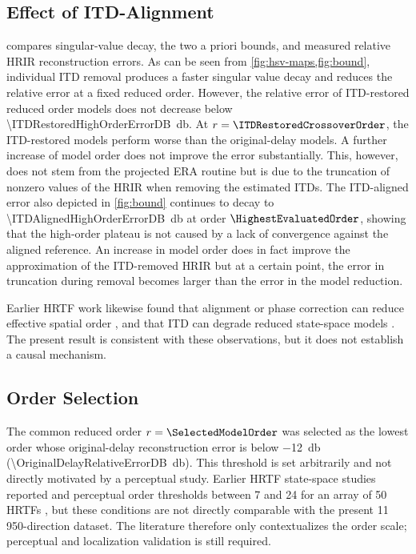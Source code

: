 \documentclass[non-peer-review]{fa2026}
\begin{document}
\subsection{Effect of \acs{ITD}-Alignment}
\label{sec:itd-results}
%
 compares singular-value decay, the two a priori bounds, and measured relative \ac{HRIR} reconstruction
errors. As can be seen from \cref{fig:hsv-maps,fig:bound}, individual \ac{ITD} removal produces a faster singular value
decay and reduces the relative error at a fixed reduced order. However, the relative error of \ac{ITD}-restored reduced
order models does not decrease below \SI{\ITDRestoredHighOrderErrorDB}{\decibel}. At \(r=\ITDRestoredCrossoverOrder\),
the \ac{ITD}-restored models perform worse than the original-delay models. A further increase of model order does not
improve the error substantially. This, however, does not stem from the projected \ac{ERA} routine but is due to the
truncation of nonzero values of the \ac{HRIR} when removing the estimated \acp{ITD}. The \ac{ITD}-aligned error also
depicted in \cref{fig:bound} continues to decay to \SI{\ITDAlignedHighOrderErrorDB}{\decibel} at order
\(\HighestEvaluatedOrder\), showing that the high-order plateau is not caused by a lack of convergence
against the aligned reference. An increase in model order does in fact improve the approximation of the \ac{ITD}-removed
\ac{HRIR} but at a certain point, the error in truncation during removal becomes larger than the error in the model
reduction.

Earlier \ac{HRTF} work likewise found that alignment or phase correction can reduce effective spatial order
\cite{ben-hur2019a}, and that \ac{ITD} can degrade reduced state-space models \cite{adams2008,pelling2026}. The present
result is consistent with these observations, but it does not establish a causal mechanism.
%
\subsection{Order Selection}
\label{sec:response-results}
%
The common reduced order \(r=\SelectedModelOrder\) was selected as the lowest order whose original-delay reconstruction
error is below \SI{-12}{\decibel} (\SI{\OriginalDelayRelativeErrorDB}{\decibel}). This threshold is set arbitrarily and not directly motivated by a perceptual study.
Earlier \ac{HRTF} state-space studies reported and perceptual order thresholds
between 7 and 24 for an array of 50 \acp{HRTF} \cite{adams2009a}, but these conditions are not directly comparable with
the present 11\,950-direction dataset. The literature therefore only contextualizes the order scale; perceptual and
localization validation is still required.
\end{document}
